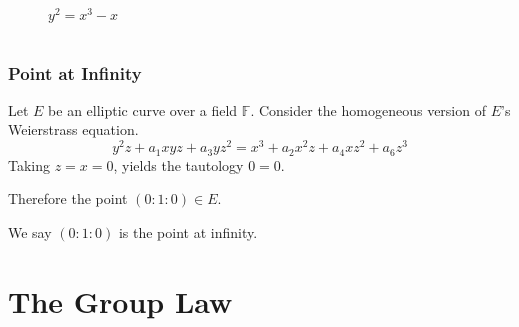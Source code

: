 \documentclass[xcolor=pdftex,dvipsnames,table]{beamer}
\theoremstyle{plain}
\theoremstyle{definition}
\def\FF{\mathbb{F}}
\begin{document}
\begin{frame}
\begin{columns}
\begin{figure}
		\caption{$y^2=x^3-x$}
	\end{figure}
	\end{columns}
\end{frame}

\begin{frame}
	\frametitle{Point at Infinity}
	
	Let $E$ be an elliptic curve over a field $\FF$.
	Consider the homogeneous version of $E$'s Weierstrass equation.
	\begin{equation}\label{PWEQN}
	y^2z+a_1xyz+a_3yz^2=x^3+a_2x^2z+a_4xz^2+a_6z^3
	\end{equation}
	Taking $z=x=0$, yields the tautology $0=0$.
	
	Therefore the point $(0:1:0)\in E$.
	
	We say $(0:1:0)$ is the point at infinity.	
\end{frame}

\section[The Group Law]{The Group Law}
\end{document}

